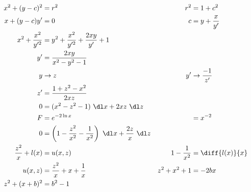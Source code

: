 \begin{enumerate}
          \begin{align}
              x^{2} + (y-c)^{2}      & = r^{2}                                   &
              r^{2}                  & = 1  + c^{2}                                \\
              x + (y-c)y'            & = 0                                       &
              c                      & =  y + \frac{x}{y'}                         \\
              x^{2}  + \frac{x^{2}}{y'^{2}}
                                     & = y^{2} + \frac{x^{2}}{y'^{2}}
              + \frac{2xy}{y'} + 1                                                 \\
              y'                     & = \frac{2xy}{x^{2} - y^{2} - 1}             \\
              y                      & \to z                                     &
              y'                     & \to \frac{-1}{z'}                           \\
              z'                     & = \frac{1 + z^{2} - x^{2}}{2xz}             \\
              0                      & = (x^{2} - z^{2} - 1)\ \dl x + 2xz\ \dl z   \\
              F                      & = e^{-2\ln x}                             &
                                     & = x^{-2}                                    \\
              0                      & = \left( 1 - \frac{z^{2}}{x^{2}}
              - \frac{1}{x^{2}}\right)\ \dl x + \frac{2z}{x}\ \dl z                \\
              \frac{z^{2}}{x} + l(x) & = u(x, z)                                 &
              1 - \frac{1}{x^{2}}    & = \diff{l(x)}{x}                            \\
              u(x, z)                & = \frac{z^{2}}{x} + x + \frac{1}{x}       &
              z^{2} + x^{2}  +1      & = -2bx                                      \\
              z^{2} + (x + b)^{2}    & = b^{2} - 1
          \end{align}


\end{enumerate}
